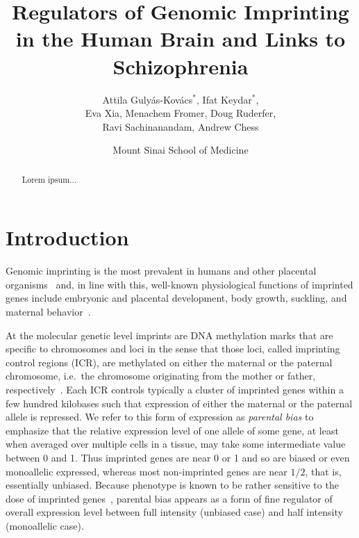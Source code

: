 \documentclass[letterpaper]{article}
\title{Regulators of Genomic Imprinting in the Human Brain and Links to Schizophrenia}
\author{Attila Guly\'{a}s-Kov\'{a}cs\(^\ast\), Ifat Keydar\(^\ast\),\\
Eva Xia, Menachem Fromer, Doug Ruderfer,\\
Ravi Sachinanandam, Andrew Chess}
\date{Mount Sinai School of Medicine}
\begin{document}
\maketitle

\newpage

\maketitle

\begin{abstract}
Lorem ipsum...
\end{abstract}

\section{Introduction}

Genomic imprinting is the most prevalent in humans and other placental
organisms~\cite{Renfree2012} and, in line with this, well-known physiological
functions of imprinted genes include embryonic and placental development, body
growth, suckling, and maternal behavior~\cite{Plasschaert2014,Peters2014}.

At the molecular genetic level imprints are DNA methylation marks that are
specific to chromosomes and loci in the sense that those loci, called
imprinting control regions (ICR), are methylated on either the maternal or the
paternal chromosome, i.e.~the chromosome originating from the mother or
father, respectively~\cite{Plasschaert2014}.  Each ICR controls typically a
cluster of imprinted genes within a few hundred kilobases such that expression
of either the maternal or the paternal allele is repressed.  We refer to this
form of expression as \emph{parental bias} to emphasize that the
relative expression level of one allele of some gene, at least when averaged
over multiple cells in a tissue, may take some intermediate value between 0
and 1.  Thus imprinted genes are near 0 or 1 and so are biased or even
monoallelic expressed, whereas most non-imprinted genes are near \(1/2\), that
is, essentially unbiased.  Because phenotype is known to be rather sensitive
to the dose of imprinted genes~\cite{McNamara2013}, parental bias appears
as a form of fine regulator of overall expression level between full intensity
(unbiased case) and half intensity (monoallelic case).
\end{document}
